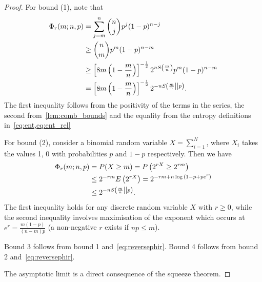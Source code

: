 \documentclass[pra,
aps,
twocolumn,
superscriptaddress,
groupedaddress,
nofootinbib,
reprint
]{revtex4-1}
\begin{document}
\begin{proof}
	For bound (1), note that
	\begin{align*}
		\Phi_r(m; n, p) &= \sum\limits_{j=m}^n \binom{n}{j} p^j (1-p)^{n-j} \\
						   &\geq \binom{n}{m} p^{m} (1-p)^{n-m} \\
						   &\geq \left[ 8m\left(1-\frac{m}{n}\right) \right]^{-\frac{1}{2}} 2^{nS\left(\frac{m}{n}\right)} p^{m} (1-p)^{n-m} \\
						   &= \left[ 8m\left(1-\frac{m}{n}\right) \right]^{-\frac{1}{2}} 2^{-n{S\left( \frac{m}{n} \middle\vert\middle\vert p \right)}}.
	\end{align*}
	The first inequality follows from the positivity of the terms in the series, the second from~\cref{lem:comb_bounds} and the equality from the entropy definitions in~\cref{eq:ent,eq:ent_rel}
	
	For bound (2), consider a binomial random variable $X = \sum_{i=1}^N$, where $X_i$ takes the values 1, 0 with probabilities $p$ and $1-p$ respectively.
	Then we have
	\begin{align*}
		\Phi_r(m; n, p) &= P(X \geq m) = P\left(2^{rX} \geq 2^{rm}\right) \\
						   &\leq 2^{-rm} E\left(2^{rX}\right) = 2^{-rm + n\log{(1-p+pe^r)}} \\
						   &\leq 2^{-n{S\left( \frac{m}{n} \middle\vert\middle\vert p \right)}}.
	\end{align*}
	The first inequality holds for any discrete random variable $X$ with $r \geq 0$, while the second inequality involves maximisation of the exponent which occurs at $e^r = \frac{m(1-p)}{(n-m)p}$ (a non-negative $r$ exists if $np \leq m$).
	
	Bound 3 follows from bound 1 and~\cref{eq:reversephir}. Bound 4 follows from bound 2 and~\cref{eq:reversephir}.
	
	The asymptotic limit is a direct consequence of the squeeze theorem.
\end{proof}
\end{document}
